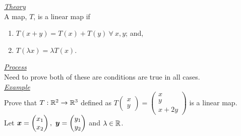 \documentclass[11pt,a4paper]{article}
\begin{document}
\underline{\textit{Theory}}\\
A map, $T$, is a linear map if
\begin{enumerate}[label=\roman*)]
  \itemsep0em
  \item $T(x + y) = T(x) + T(y)\ \forall\ x, y$; and,
  \item $T(\lambda x) = \lambda T(x)$.
\end{enumerate}

\underline{\textit{Process}}\\
Need to prove both of these are conditions are true in all cases.\\

\underline{\textit{Example}}\\
Prove that $T : \mathbb{R}^2 \to \mathbb{R}^3$ defined as $T\begin{pmatrix} x \\ y \end{pmatrix} = \begin{pmatrix} x \\ y \\ x+2y \end{pmatrix}$ is a linear map.\\
Let $\boldsymbol{x} = \begin{pmatrix} x_1 \\ x_2 \end{pmatrix},\ \boldsymbol{y} = \begin{pmatrix} y_1 \\ y_2 \end{pmatrix}$ and $\lambda \in \mathbb{R}$.
\end{document}
